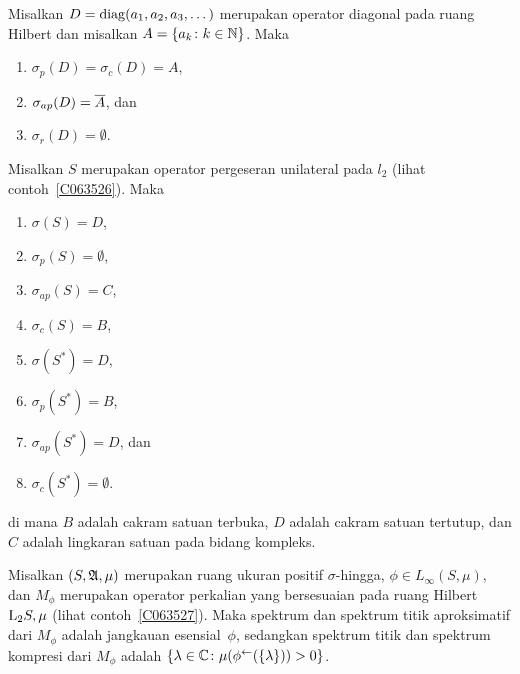 \begin{exam} Misalkan $D = \operatorname{diag}(a_1,a_2,a_3,\dots)$ merupakan operator diagonal pada ruang Hilbert dan misalkan
$A = \{a_k\colon k\in\mathbb{N}\}$. Maka
   \begin{enumerate}[label=(\alph*)]
     \item $\sigma_p(D) = \sigma_c(D) = A$,
     \item $\sigma_{ap}(D) = \overline{A}$, dan
     \item $\sigma_r(D) = \emptyset$.
   \end{enumerate}
\end{exam}

\begin{exam} Misalkan $S$ merupakan operator pergeseran unilateral pada $l_2$
(lihat contoh~\ref{C063526}). Maka
    \begin{enumerate}[label=(\alph*)]
      \item $\sigma(S) = D$,
      \item $\sigma_p(S) = \emptyset$,
      \item $\sigma_{ap}(S) = C$,
      \item $\sigma_c(S) = B$,
      \item $\sigma(S^*) = D$,
      \item $\sigma_p(S^*) = B$,
      \item $\sigma_{ap}(S^*) = D$, dan
      \item $\sigma_c(S^*) = \emptyset$.
    \end{enumerate}
di mana $B$ adalah cakram satuan terbuka, $D$ adalah cakram satuan tertutup, dan $C$ adalah lingkaran satuan pada bidang kompleks.
\end{exam}

\begin{exam} Misalkan $(S,\mathfrak{A}, \mu)$ merupakan ruang ukuran positif $\sigma$-hingga, $\phi \in L_\infty(S,\mu)$, dan $M_\phi$ merupakan
operator perkalian yang bersesuaian pada ruang Hilbert $\mathrm{L_{2}}{S,\mu}$ (lihat contoh~\ref{C063527}). Maka
spektrum dan spektrum titik aproksimatif dari $M_\phi$ adalah jangkauan esensial~$\phi$, sedangkan spektrum titik
dan spektrum kompresi dari $M_\phi$ adalah $\{\lambda \in \mathbb{C}\colon \mu(\phi^{\gets}(\{\lambda\})) > 0\}$.
\end{exam}






















\endinput
